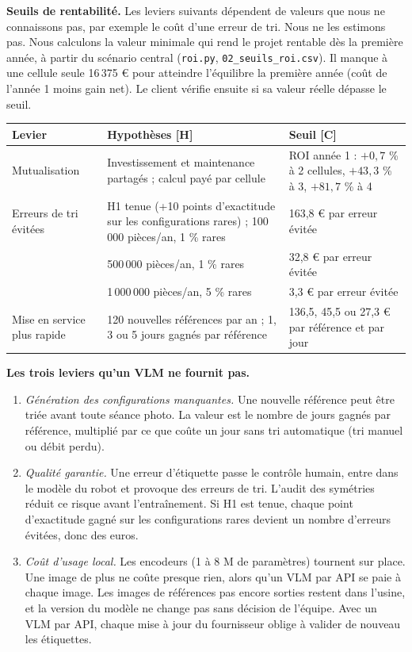 \documentclass[10pt,a4paper]{article}
\begin{document}
\textbf{Seuils de rentabilité.} Les leviers suivants dépendent de valeurs que nous ne connaissons pas, par exemple le coût d'une erreur de tri. Nous ne les estimons pas. Nous calculons la valeur minimale qui rend le projet rentable dès la première année, à partir du scénario central (\texttt{roi.py}, \texttt{02\_seuils\_roi.csv}). Il manque à une cellule seule 16\,375 € pour atteindre l'équilibre la première année (coût de l'année 1 moins gain net). Le client vérifie ensuite si sa valeur réelle dépasse le seuil.

\begin{center}\small
\begin{tabularx}{\textwidth}{@{}P{3.3cm}LP{4.6cm}@{}}
\toprule
Levier & Hypothèses [H] & Seuil [C] \\
\midrule
Mutualisation & Investissement et maintenance partagés ; calcul payé par cellule & ROI année 1 : $+0{,}7$ \% à 2 cellules, $+43{,}3$ \% à 3, $+81{,}7$ \% à 4 \\
Erreurs de tri évitées & H1 tenue (+10 points d'exactitude sur les configurations rares) ; 100\,000 pièces/an, 1 \% rares & 163,8 € par erreur évitée \\
 & 500\,000 pièces/an, 1 \% rares & 32,8 € par erreur évitée \\
 & 1\,000\,000 pièces/an, 5 \% rares & 3,3 € par erreur évitée \\
Mise en service plus rapide & 120 nouvelles références par an ; 1, 3 ou 5 jours gagnés par référence & 136,5, 45,5 ou 27,3 € par référence et par jour \\
\bottomrule
\end{tabularx}
\end{center}

\textbf{Les trois leviers qu'un VLM ne fournit pas.}
\begin{enumerate}
\item \emph{Génération des configurations manquantes.} Une nouvelle référence peut être triée avant toute séance photo. La valeur est le nombre de jours gagnés par référence, multiplié par ce que coûte un jour sans tri automatique (tri manuel ou débit perdu).
\item \emph{Qualité garantie.} Une erreur d'étiquette passe le contrôle humain, entre dans le modèle du robot et provoque des erreurs de tri. L'audit des symétries réduit ce risque avant l'entraînement. Si H1 est tenue, chaque point d'exactitude gagné sur les configurations rares devient un nombre d'erreurs évitées, donc des euros.
\item \emph{Coût d'usage local.} Les encodeurs (1 à 8 M de paramètres) tournent sur place. Une image de plus ne coûte presque rien, alors qu'un VLM par API se paie à chaque image. Les images de références pas encore sorties restent dans l'usine, et la version du modèle ne change pas sans décision de l'équipe. Avec un VLM par API, chaque mise à jour du fournisseur oblige à valider de nouveau les étiquettes.
\end{enumerate}
\end{document}
